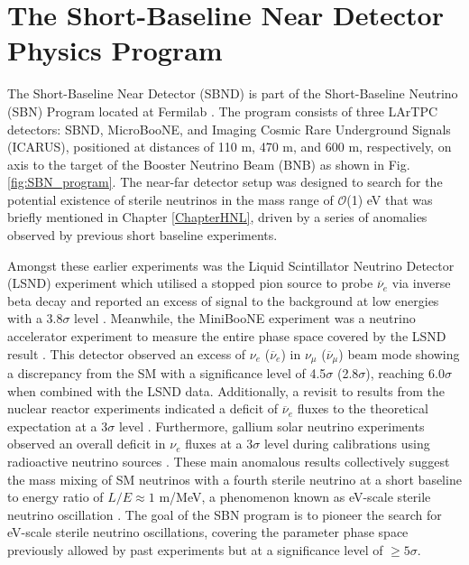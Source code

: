 \newpage
\section{The Short-Baseline Near Detector Physics Program}
\label{sec4PhysicsProgram}

The Short-Baseline Near Detector (SBND) is part of the Short-Baseline Neutrino (SBN) Program located at Fermilab \cite{SBNProgram}. 
The program consists of three LArTPC detectors: SBND, MicroBooNE, and Imaging Cosmic Rare Underground Signals (ICARUS), positioned at distances of 110 m, 470 m, and 600 m, respectively, on axis to the target of the Booster Neutrino Beam (BNB) as shown in Fig. \ref{fig:SBN_program}.
The near-far detector setup was designed to search for the potential existence of sterile neutrinos in the mass range of $\mathcal{O}$(1) eV that was briefly mentioned in Chapter \ref{ChapterHNL}, driven by a series of anomalies observed by previous short baseline experiments.

Amongst these earlier experiments was the Liquid Scintillator Neutrino Detector (LSND) experiment which utilised a stopped pion source to probe $\overline{\nu}_{e}$ via inverse beta decay and reported an excess of signal to the background at low energies with a 3.8$\sigma$ level \cite{LSND_anomaly}. 
Meanwhile, the MiniBooNE experiment was a neutrino accelerator experiment to measure the entire phase space covered by the LSND result \cite{Miniboone_anomaly}.
This detector observed an excess of $\nu_{e}$ ($\overline{\nu}_{e}$) in $\nu_{\mu}$ ($\overline{\nu}_{\mu}$) beam mode showing a discrepancy from the SM with a significance level of 4.5$\sigma$ (2.8$\sigma$), reaching 6.0$\sigma$ when combined with the LSND data.
Additionally, a revisit to results from the nuclear reactor experiments indicated a deficit of $\overline{\nu}_{e}$ fluxes to the theoretical expectation at a 3$\sigma$ level \cite{reactor_anomaly_1, reactor_anomaly_2}. 
Furthermore, gallium solar neutrino experiments observed an overall deficit in $\nu_{e}$ fluxes at a 3$\sigma$ level during calibrations using radioactive neutrino sources \cite{galium_anomaly_1, galium_anomaly_2}.
These main anomalous results collectively suggest the mass mixing of SM neutrinos with a fourth sterile neutrino at a short baseline to energy ratio of $L/E \approx 1 $ m/MeV, a phenomenon known as eV-scale sterile neutrino oscillation \cite{SBNProgram}.
The goal of the SBN program is to pioneer the search for eV-scale sterile neutrino oscillations, covering the parameter phase space previously allowed by past experiments but at a significance level of $\geq 5 \sigma$.

